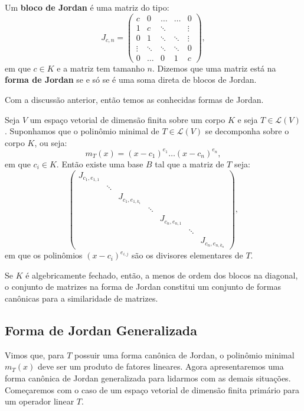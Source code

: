 \documentclass[11pt,twoside,a4paper]{book}
\begin{document}
\begin{definicao}
Um \textbf{bloco de Jordan} é uma matriz do tipo:
\[
J_{c,n}=\begin{pmatrix}
c&0&\ldots&\ldots&0\\1&c&\ddots&&\vdots\\0&1&\ddots&\ddots&\vdots\\\vdots&\ddots&\ddots&\ddots&0\\0&\ldots&0&1&c
\end{pmatrix},
\]
em que $c\in K$ e a matriz tem tamanho $n$. Dizemos que uma matriz está na \textbf{forma de Jordan} se e só se é uma soma direta de blocos de Jordan.
\end{definicao}

\noindent
Com a discussão anterior, então temos as conhecidas formas de Jordan.

\begin{teorema}
Seja $V$ um espaço vetorial de dimensão finita sobre um corpo $K$ e seja $T\in\mathcal{L}(V)$. Suponhamos que o polinômio minimal de $T\in\mathcal{L}(V)$ se decomponha sobre o corpo $K$, ou seja:
\[
m_T(x)=(x-c_1)^{e_1}\dots(x-c_n)^{e_n},
\]
em que $c_i\in K$. Então existe uma base $B$ tal que a matriz de $T$ seja:
\[
\begin{pmatrix}
J_{c_1,e_{1,1}}&&&&&&\\&\ddots&&&&&\\&&J_{c_1,e_{1,k_1}}&&&&\\&&&\ddots&&&\\&&&&J_{c_n,e_{n,1}}&&\\&&&&&\ddots&\\&&&&&&J_{c_n,e_{n,k_n}}
\end{pmatrix},
\]
em que os polinômios $(x-c_i)^{e_{i,j}}$ são os divisores elementares de $T$.
\end{teorema}

\begin{corolario}
Se $K$ é algebricamente fechado, então, a menos de ordem dos blocos na diagonal, o conjunto de matrizes na forma de Jordan constitui um conjunto de formas canônicas para a similaridade de matrizes.
\end{corolario}

\subsection{Forma de Jordan Generalizada}

Vimos que, para $T$ possuir uma forma canônica de Jordan, o polinômio minimal $m_T(x)$ deve ser um produto de fatores lineares. Agora apresentaremos uma forma canônica de Jordan generalizada para lidarmos com as demais situações. Começaremos com o caso de um espaço vetorial de dimensão finita primário para um operador linear $T$.
\end{document}
